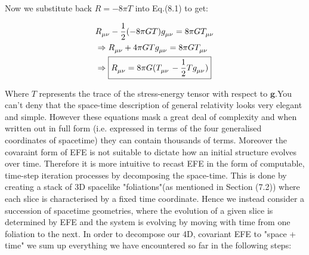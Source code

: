 \documentclass[12pt]{article}
\renewcommand{\vec}[1]{\bm{#1}}
\numberwithin{equation}{section}
\numberwithin{theorem}{subsection}
\begin{document}
Now we substitute back $R = -8\pi T$ into Eq.(8.1) to get:

\begin{align}

    &\tensor{R}{_\mu_\nu} - \frac{1}{2} (-8 \pi G T) \tensor{g}{_\mu_\nu} = 8\pi G \tensor{T}{_\mu_\nu} \notag \\

    &\Rightarrow \tensor{R}{_\mu_\nu} + 4\pi G T\tensor{g}{_\mu_\nu} = 8\pi G \tensor{T}{_\mu_\nu} \notag \\

    &\Rightarrow \boxed{\tensor{R}{_\mu_\nu} = 8\pi G (\tensor{T}{_\mu_\nu} - \frac{1}{2}T\tensor{g}{_\mu_\nu})}

\end{align}

Where $T$ represents the trace of the stress-energy tensor with respect to $\vec{g}$.\smallskip \newline You can't deny that the space-time description of general relativity looks very elegant and simple. However these equations mask a great deal of complexity and when written out in full form (i.e. expressed in terms of the four generalised coordinates of spacetime) they can contain thousands of terms. Moreover the covaraint form of EFE is not suitable to dictate how an initial structure evolves over time. Therefore it is more intuitive to recast EFE in the form of computable, time-step iteration processes by decomposing the space-time. This is done by creating a stack of 3D spacelike "foliations"(as mentioned in Section (7.2)) where each slice is characterised by a fixed time coordinate. Hence we instead consider a succession of spacetime geometries, where the evolution of a given slice is determined by EFE and the system is evolving by moving with time from one foliation to the next. In order to decompose our 4D, covariant EFE to "space + time" we sum up everything we have encountered so far in the following steps:
\end{document}
